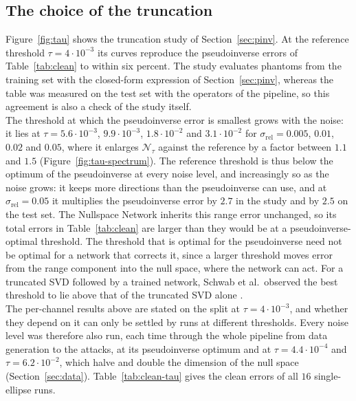 \documentclass{article}
\numberwithin{equation}{section}
\begin{document}
\subsection{The choice of the truncation}\label{sec:results-tau}
Figure~\ref{fig:tau} shows the truncation study of Section~\ref{sec:pinv}. At the reference threshold
$\tau=4\cdot10^{-3}$ its curves reproduce the pseudoinverse errors of Table~\ref{tab:clean} to within
six percent. The study evaluates phantoms from the training set with the closed-form expression of
Section~\ref{sec:pinv}, whereas the table was measured on the test set with the operators of the
pipeline, so this agreement is also a check of the study itself.\\
The threshold at which the pseudoinverse error is smallest grows with the noise: it lies at
$\tau=5.6\cdot10^{-3}$, $9.9\cdot10^{-3}$, $1.8\cdot10^{-2}$ and $3.1\cdot10^{-2}$ for
$\sigma_\text{rel}=0.005$, $0.01$, $0.02$ and $0.05$, where it enlarges $\mathcal{N}_\tau$ against the
reference by a factor between $1.1$ and $1.5$ (Figure~\ref{fig:tau-spectrum}). The reference
threshold is thus below the optimum of the pseudoinverse at every noise level, and increasingly so as the
noise grows: it keeps more directions than the pseudoinverse can use, and at $\sigma_\text{rel}=0.05$ it
multiplies the pseudoinverse error by $2.7$ in the study and by $2.5$ on the test set. The Nullspace Network inherits this range error unchanged, so its total
errors in Table~\ref{tab:clean} are larger than they would be at a pseudoinverse-optimal threshold. The
threshold that is optimal for the pseudoinverse need not be optimal for a network that corrects it,
since a larger threshold moves error from the range component into the null space, where the network
can act. For a truncated SVD followed by a trained network, Schwab et al.\ observed the best threshold
to lie above that of the truncated SVD alone \parencite{schwab2020bigjapan}.\\
The per-channel results above are stated on the split at $\tau=4\cdot10^{-3}$, and whether they depend
on it can only be settled by runs at different thresholds. Every noise level was therefore also run, each
time through the whole pipeline from data generation to the attacks, at its pseudoinverse optimum and at
$\tau=4.4\cdot10^{-4}$ and $\tau=6.2\cdot10^{-2}$, which halve and double the dimension of the null space
(Section~\ref{sec:data}). Table~\ref{tab:clean-tau} gives the clean errors of all $16$ single-ellipse runs.
\end{document}
